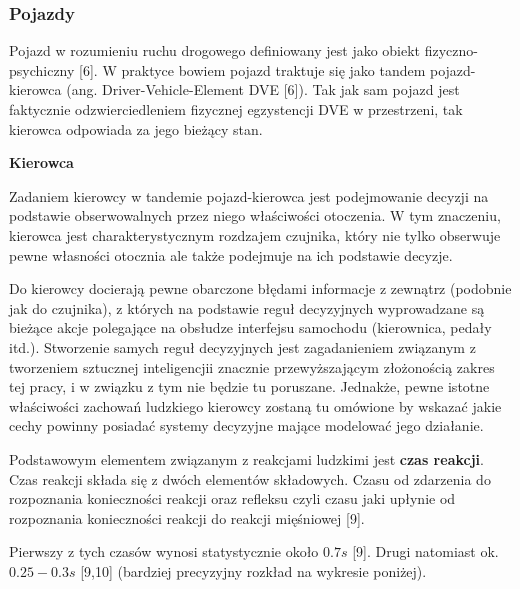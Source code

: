 {{\subsubsection{Pojazdy}
\par{
Pojazd w rozumieniu ruchu drogowego definiowany jest jako obiekt fizyczno-psychiczny [6]. W praktyce bowiem pojazd traktuje się jako tandem pojazd-kierowca (ang. Driver-Vehicle-Element DVE [6]). Tak jak sam pojazd jest faktycznie odzwierciedleniem fizycznej egzystencji DVE w przestrzeni, tak kierowca odpowiada za jego bieżący stan.
}
\par{ }
\par{
\textbf{Kierowca}
}
\par{
Zadaniem kierowcy w tandemie pojazd-kierowca jest podejmowanie decyzji na podstawie obserwowalnych przez niego właściwości otoczenia. W tym znaczeniu, kierowca jest charakterystycznym rozdzajem czujnika, który nie tylko obserwuje pewne własności otocznia ale także podejmuje na ich podstawie decyzje.
}
\par{
Do kierowcy docierają pewne obarczone błędami informacje z zewnątrz (podobnie jak do czujnika), z których na podstawie reguł decyzyjnych wyprowadzane są bieżące akcje polegające na obsłudze interfejsu samochodu (kierownica, pedały itd.). Stworzenie samych reguł decyzyjnych jest zagadanieniem związanym z tworzeniem sztucznej inteligencjii znacznie przewyższającym złożonością zakres tej pracy, i w związku z tym nie będzie tu poruszane. Jednakże, pewne istotne właściwości zachowań ludzkiego kierowcy zostaną tu omówione by wskazać jakie cechy powinny posiadać systemy decyzyjne mające modelować jego działanie.
}
\par{
Podstawowym elementem związanym z reakcjami ludzkimi jest \textbf{czas reakcji}. Czas reakcji składa się z dwóch elementów składowych. Czasu od zdarzenia do rozpoznania konieczności reakcji oraz refleksu czyli czasu jaki upłynie od rozpoznania konieczności reakcji do reakcji mięśniowej [9].
}
\par{
Pierwszy z tych czasów wynosi statystycznie około $0.7s$ [9]. Drugi natomiast ok. $0.25-0.3s$ [9,10] (bardziej precyzyjny rozkład na wykresie poniżej).
}
\par{
\begin{center}

\end{center}}}}
